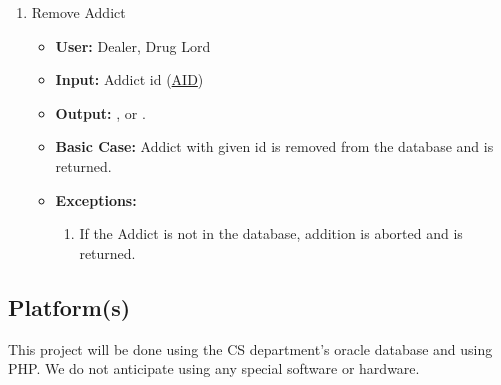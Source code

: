 \documentclass[11pt, oneside]{article}   	%
\theoremstyle{definition}
\theoremstyle{remark}
\begin{document}
\begin{enumerate}
	\item Remove Addict
	\begin{itemize}
		\item \textbf{User:} Dealer, Drug Lord
		\item \textbf{Input:} Addict id (\underline{AID})
		\item \textbf{Output:} , or .
		\item \textbf{Basic Case:} Addict with given id is removed from the database and  is returned.
		\item \textbf{Exceptions:}
		\begin{enumerate}
			\item If the Addict is not in the database, addition is aborted and  is returned.
		\end{enumerate}
	\end{itemize}
\end{enumerate}


\subsection{Platform(s)}
This project will be done using the CS department's oracle database and using PHP. We do not anticipate using any special software or hardware.




%
%
%
%
%
%
%
%
%
%
%
%
%
%
\end{document}

